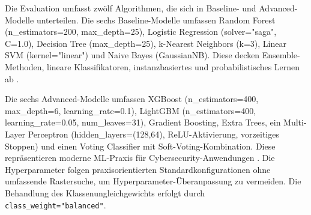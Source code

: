 \documentclass[11pt,a4paper]{article}
\begin{document}

    Die Evaluation umfasst zwölf Algorithmen, die sich in Baseline- und Advanced-Modelle unterteilen. Die sechs Baseline-Modelle umfassen Random Forest (n\_estimators=200, max\_depth=25), Logistic Regression (solver="saga", C=1.0), Decision Tree (max\_depth=25), k-Nearest Neighbors (k=3), Linear SVM (kernel="linear") und Naive Bayes (GaussianNB). Diese decken Ensemble-Methoden, lineare Klassifikatoren, instanzbasiertes und probabilistisches Lernen ab \parencite{Hastie2009}.

    Die sechs Advanced-Modelle umfassen XGBoost (n\_estimators=400, max\_depth=6, learning\_rate=0.1), LightGBM (n\_estimators=400, learning\_rate=0.05, num\_leaves=31), Gradient Boosting, Extra Trees, ein Multi-Layer Perceptron (hidden\_layers=(128,64), ReLU-Aktivierung, vorzeitiges Stoppen) und einen Voting Classifier mit Soft-Voting-Kombination. Diese repräsentieren moderne ML-Praxis für Cybersecurity-Anwendungen \parencite{Vinayakumar2019}. Die Hyperparameter folgen praxisorientierten Standardkonfigurationen ohne umfassende Rastersuche, um Hyperparameter-Überanpassung zu vermeiden. Die Behandlung des Klassenungleichgewichts erfolgt durch \texttt{class\_weight="balanced"}.
\end{document}
